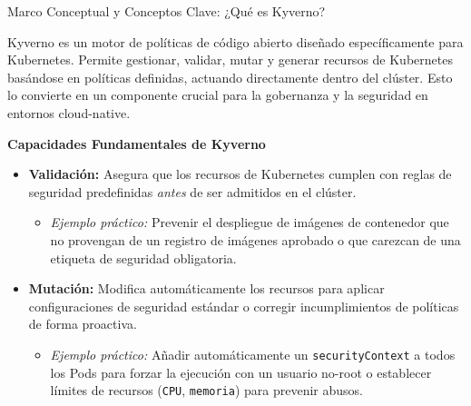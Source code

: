 \documentclass[aspectratio=169]{beamer}
\begin{document}
\begin{frame}{Marco Conceptual y Conceptos Clave: ¿Qué es Kyverno?}


Kyverno es un motor de políticas de código abierto diseñado específicamente para Kubernetes. Permite gestionar, validar, mutar y generar recursos de Kubernetes basándose en políticas definidas, actuando directamente dentro del clúster. Esto lo convierte en un componente crucial para la gobernanza y la seguridad en entornos cloud-native.

\textbf{Capacidades Fundamentales de Kyverno}
\begin{itemize}
  \item \textbf{Validación:} Asegura que los recursos de Kubernetes cumplen con reglas de seguridad predefinidas \textit{antes} de ser admitidos en el clúster.
  \begin{itemize}
    \item \textit{Ejemplo práctico:} Prevenir el despliegue de imágenes de contenedor que no provengan de un registro de imágenes aprobado o que carezcan de una etiqueta de seguridad obligatoria.
  \end{itemize}
  \item \textbf{Mutación:} Modifica automáticamente los recursos para aplicar configuraciones de seguridad estándar o corregir incumplimientos de políticas de forma proactiva.
  \begin{itemize}
    \item \textit{Ejemplo práctico:} Añadir automáticamente un \texttt{securityContext} a todos los Pods para forzar la ejecución con un usuario no-root o establecer límites de recursos (\texttt{CPU}, \texttt{memoria}) para prevenir abusos.
  \end{itemize}
\end{itemize}
\end{frame}
\end{document}
